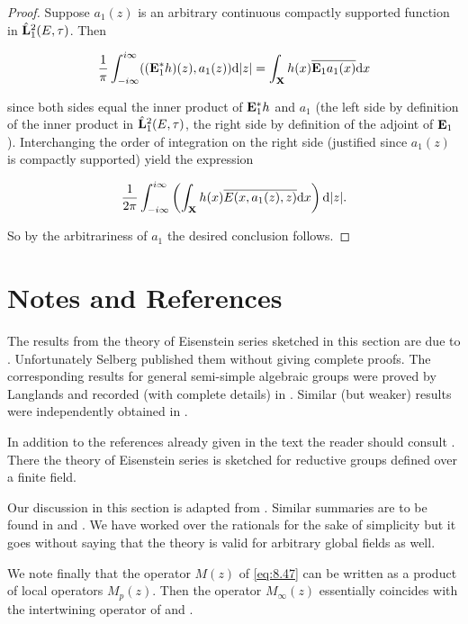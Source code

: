 \begin{proof}

Suppose $a_{1}(z)$ is an arbitrary continuous compactly supported function in $\hat{\mathbf{L}}_{1}^{2}(E,\tau)$. Then

\[
\frac{1}{\pi}\int_{-i\infty}^{i\infty} ((\mathbf{E}_{1}^{*}h)(z),a_{1}(z)) \mathrm{d}|z| = \int_{\mathbf{X}} h(x)\overline{\mathbf{E}_{1}a_{1}(x)} \mathrm{d} x
\]

since both sides equal the inner product of $\mathbf{E}_{1}^{*}h$ and $a_{1}$ (the left side by definition of the inner product in $\hat{\mathbf{L}}_{1}^{2}(E,\tau)$, the right side by definition of the adjoint of $\mathbf{E}_{1}$). Interchanging the order of integration on the right side (justified since $a_{1}(z)$ is compactly supported) yield the expression

\[
\frac{1}{2\pi}\int_{-i\infty}^{i\infty} \left(\int_{\mathbf{X}} h(x)\overline{E(x,a_{1}(z),z)} \mathrm{d} x\right) \mathrm{d}|z|.
\]

So by the arbitrariness of $a_{1}$ the desired conclusion follows.

\end{proof}

\section*{Notes and References}


The results from the theory of Eisenstein series sketched in this section are due to \cite{Selberg}. Unfortunately Selberg published them without giving complete proofs. The corresponding results for general semi-simple algebraic groups were proved by Langlands and recorded (with complete details) in \cite{Langlands4,Langlands5}. Similar (but weaker) results were independently obtained in \cite{GelfandGraevPyatetskiiShapiro}.

In addition to the references already given in the text the reader should consult \cite{HarishChandra3}. There the theory of Eisenstein series is sketched for reductive groups defined over a finite field.

Our discussion in this section is adapted from \cite{Arthur}. Similar summaries are to be found in \cite{DufloLabesse} and \cite{Godement2,Godement3}. We have worked over the rationals for the sake of simplicity but it goes without saying that the theory is valid for arbitrary global fields as well.

We note finally that the operator $M(z)$ of \eqref{eq:8.47} can be written as a product of local operators $M_{p}(z)$. Then the operator $M_{\infty}(z)$ essentially coincides with the intertwining operator of \cite{KunzeStein} and \cite{KnappStein}.
